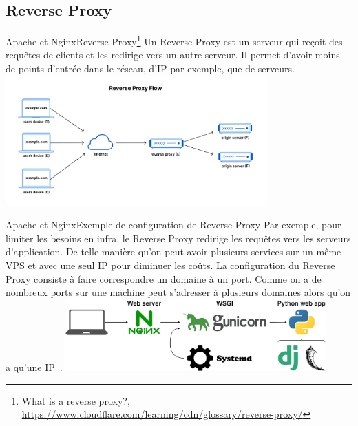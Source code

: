 \documentclass{beamer}
\begin{document}
    \subsection{Reverse Proxy}\label{subsec:reverse-proxy}

    \begin{frame}{Apache et Nginx}{Reverse Proxy\footnote{What is a reverse proxy?, \url{https://www.cloudflare.com/learning/cdn/glossary/reverse-proxy/}}}
        Un Reverse Proxy est un serveur qui reçoit des requêtes de clients et les redirige vers un autre serveur.
        Il permet d'avoir moins de points d'entrée dans le réseau, d'IP par exemple, que de serveurs.
        \bigbreak
        \centering
        \includegraphics[width=10cm]{image/reverse-proxy-flow}
    \end{frame}

    \begin{frame}{Apache et Nginx}{Exemple de configuration de Reverse Proxy}
        Par exemple, pour limiter les besoins en infra, le Reverse Proxy redirige les requêtes vers les serveurs d'application.
        De telle manière qu'on peut avoir plusieurs services sur un même VPS et avec une seul IP pour diminuer les coûts.
        \bigbreak
        La configuration du Reverse Proxy consiste à faire correspondre un domaine à un port.
        Comme on a de nombreux ports sur une machine peut s'adresser à plusieurs domaines alors qu'on a qu'une IP~.
        \bigbreak
        \centering
        \includegraphics[width=10cm]{image/flask-gunicorn-nginx}
    \end{frame}
\end{document}

